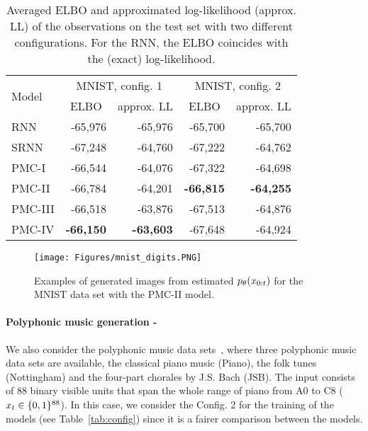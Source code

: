 \begin{table}[!htpb]
    \begin{center}
    \begin{tabular}{|l|r|r|r|r|}
        \hline
        
        \multirow{2}{*}{Model}     &\multicolumn{2}{c|}{MNIST, config. 1}&\multicolumn{2}{c|}{MNIST, config. 2}\\ 
        \cline{2-5} 
    & \multicolumn{1}{c|}{ELBO} & \multicolumn{1}{c|}{approx. LL } & \multicolumn{1}{c|}{ELBO} & \multicolumn{1}{c|}{approx. LL } \\ 
    \hline \hline
    RNN    & -65,976 & -65,976& -65,700 & -65,700 \\ %
    SRNN    & -67,248 & -64,760 & -67,222 & -64,762 \\ %
    PMC-I   & -66,544 & -64,076 & -67,322 & -64,698 \\ %
    PMC-II  & -66,784 & -64,201 & \textbf{-66,815} & \textbf{-64,255} \\ %
    PMC-III & -66,518 & -63,876 & -67,513 & -64,876 \\ %
    PMC-IV & \textbf{-66,150} & \textbf{-63,603} & -67,648 & -64,924 \\ \hline
    \end{tabular}    
    \end{center}
    \caption{Averaged ELBO and approximated log-likelihood (approx. LL) of the observations 
    on the test set with two different configurations. 
    For the RNN, the ELBO coincides with the (exact) log-likelihood.}
    \label{tab:t1}
\end{table}


\begin{figure}[!htpb]
    \centering
    \centerline{\texttt{[image: Figures/mnist\_digits.PNG]}}
  \caption{Examples of generated images from estimated $p_{\theta}(x_{0:t})$ for
  the MNIST  data set with the PMC-II model.}
  \label{fig:images}
  \end{figure}


\paragraph*{Polyphonic music generation - }
We also consider the polyphonic music data sets~\citep{bengio2013advances},
where three polyphonic music data sets are available, the classical piano music 
(Piano), the folk tunes (Nottingham) and the four-part chorales by J.S. Bach (JSB). 
The input consists of $88$ binary visible units that span the whole 
range of piano from A0 to C8  (\ie~$x_t \in \{0,1\}^{88}$).
In this case, we consider the Config. 2 for the training of the models (see Table~\ref{tab:config})
since it is a fairer comparison between the models.

